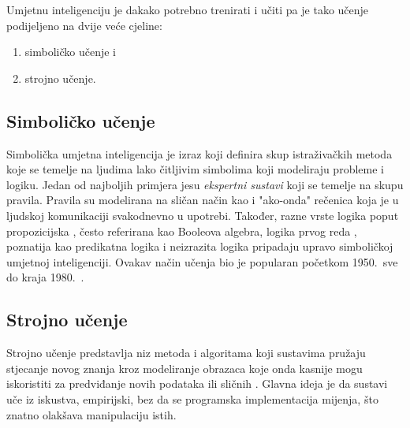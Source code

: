 \documentclass[times, utf8, zavrsni]{fer}
\begin{document}
Umjetnu inteligenciju je dakako potrebno trenirati i učiti pa je tako učenje podijeljeno na dvije veće cjeline:
\begin{center}
    \begin{enumerate}
        \item simboličko učenje i
        \item strojno učenje.
    \end{enumerate}
\end{center}

\subsection{Simboličko učenje}
Simbolička umjetna inteligencija  je izraz koji definira skup istraživačkih metoda koje se temelje na ljudima lako čitljivim simbolima  koji modeliraju probleme i logiku. Jedan od najboljih primjera jesu \textit{ekspertni sustavi}  koji se temelje na skupu pravila. Pravila su modelirana na sličan način kao i "ako-onda" rečenica  koja je u ljudskoj komunikaciji svakodnevno u upotrebi. Također, razne vrste logika poput propozicijska , često referirana kao Booleova algebra, logika prvog reda , poznatija kao predikatna logika  i neizrazita logika  pripadaju upravo simboličkoj umjetnoj inteligenciji. Ovakav način učenja bio je popularan početkom 1950.\ sve do kraja 1980.\ \citep{wiki:SIMB}.

\subsection{Strojno učenje}
Strojno učenje  predstavlja niz metoda i algoritama koji sustavima pružaju stjecanje novog znanja kroz modeliranje obrazaca koje onda kasnije mogu iskoristiti za predviđanje novih podataka ili sličnih \citep{cupicML}. Glavna ideja je da sustavi uče iz iskustva, empirijski, bez da se programska implementacija mijenja, što znatno olakšava manipulaciju istih.
\end{document}
